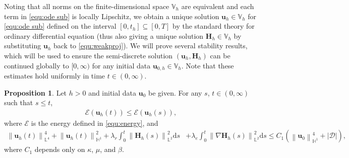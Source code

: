 \documentclass[11pt, reqno]{amsart}
\theoremstyle{definition}
\newtheorem{lemma}[theorem]{Lemma}
\newtheorem{proposition}[theorem]{Proposition}
\theoremstyle{remark}
\numberwithin{equation}{section}
\newcommand{\cal}{\mathcal}
\newcommand{\bff}{\boldsymbol}
\newcommand{\bb}{\mathbb}
\newcommand{\ds}{\mathrm{d}s}
\newcommand{\norm}[2]{\left\|{#1}\right\|_{#2}}
\begin{document}
Noting that all norms on the finite-dimensional space $\bb{V}_h$ are equivalent and each term in \eqref{equ:ode sub} is locally Lipschitz, we obtain a unique solution $\bff{u}_h\in \bb{V}_h$ for \eqref{equ:ode sub} defined on the interval $[0, t_h]\subseteq [0,T]$ by the standard theory for ordinary differential equation (thus also giving a unique solution $\bff{H}_h \in \bb{V}_h$ by substituting $\bff{u}_h$ back to \eqref{equ:weakproj}). We will prove several stability results, which will be used to ensure the semi-discrete solution $(\bff{u}_h, \bff{H}_h)$ can be continued globally to $[0,\infty)$ for any initial data $\bff{u}_{0,h}\in \bb{V}_h$. Note that these estimates hold uniformly in time $t\in (0,\infty)$.



\begin{proposition}\label{pro:semidisc est1}
Let $h>0$ and initial data $\bff{u}_0$ be given. For any $s$, $t\in (0,\infty)$ such that $s\leq t$,
\begin{align}
	\label{equ:semidisc-est ener}
	\cal{E}(\bff{u}_h(t))
	\leq
	\cal{E}(\bff{u}_h(s)),
\end{align}
where $\cal{E}$ is the energy defined in \eqref{equ:energy}, and
\begin{align}
	\label{equ:semidisc-est1}
	\norm{\bff{u}_h(t)}{\bb{L}^4}^4 
	+  
	\norm{\bff{u}_h(t)}{\bb{H}^1}^2 
	+
	\lambda_r \int_0^t \norm{\bff{H}_h(s)}{\bb{L}^2}^2 \ds
	&+
	\lambda_e \int_0^t \norm{\nabla \bff{H}_h(s)}{\bb{L}^2}^2 \ds
\leq
	C_1 \left(\norm{\bff{u}_0}{\bb{H}^1}^4
	+
	|\mathscr{D}| \right),
\end{align}
where $C_1$ depends only on $\kappa$, $\mu$, and $\beta$.
\end{proposition}
\end{document}
